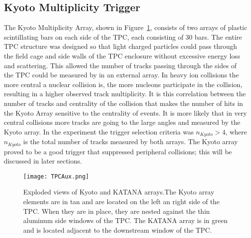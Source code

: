 \subsection{Kyoto Multiplicity Trigger}
\label{sec:kyoto}
 The Kyoto Multiplicity Array, shown in Figure~\ref{fig:aux}, consists of two arrays of plastic scintillating bars on each side of the TPC, each consisting of 30 bars. The entire TPC structure was designed so that light charged particles could pass through the field cage and side walls of the TPC enclosure without excessive energy loss and scattering. This allowed the number of tracks passing through the sides of the TPC could be measured by in an external array. In heavy ion collisions the more central a nuclear collision is, the more nucleons participate in the collision, resulting in a higher observed track multiplicity. It is this correlation between the number of tracks and centrality of the collision that makes the number of hits in the Kyoto Array sensitive to the centrality of events. It is more likely that in very central collisions more tracks are going to the large angles and measured by the Kyoto array. In the experiment the trigger selection criteria was $n_{Kyoto} > 4$, where $n_{Kyoto}$ is the total number of tracks measured by both arrays. The Kyoto array proved to be a good trigger that suppressed peripheral collisions; this will be discussed in later sections. 

\begin{figure}[!htb]
\texttt{[image: TPCAux.png]}
\caption{Exploded views of Kyoto and KATANA arrays.The Kyoto array elements are in tan and are located on the left an right side of the TPC. When they are in place, they are nested against the thin aluminum side windows of the TPC. The KATANA array is in green and is located adjacent to the downstream window of the TPC.}
\label{fig:aux}
\end{figure}


